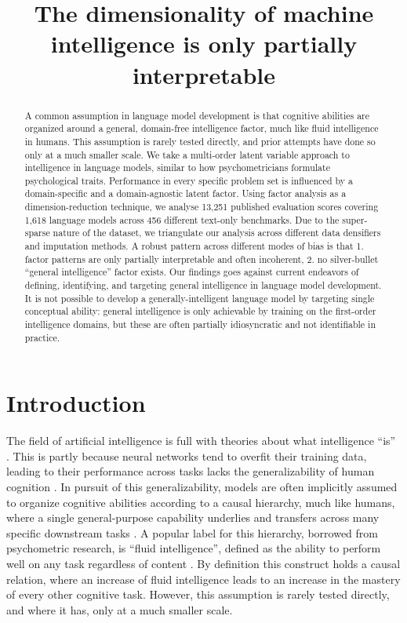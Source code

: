 \documentclass{article} %
\title{The dimensionality of machine intelligence is only partially interpretable}
\author{%
}
\begin{document}
\maketitle


\begin{abstract}
    A common assumption in language model development is that cognitive abilities are organized around a general, domain-free intelligence factor, much like fluid intelligence in humans. This
    assumption is rarely tested directly, and prior attempts have done so only at a much smaller scale. We take a multi-order latent variable approach to intelligence in language models, similar to
    how psychometricians formulate psychological traits. Performance in every specific problem set is influenced by a domain-specific and a domain-agnostic latent factor. Using factor analysis as a
    dimension-reduction technique, we analyse 13,251 published evaluation scores covering 1,618 language models across 456 different text-only benchmarks. Due to the super-sparse nature of the
    dataset, we triangulate our analysis across different data densifiers and imputation methods. A robust pattern across different modes of bias is that 1. factor patterns are only partially
    interpretable and often incoherent, 2. no silver-bullet ``general intelligence'' factor exists. Our findings goes against current endeavors of defining, identifying, and targeting general
    intelligence in language model development. It is not possible to develop a generally-intelligent language model by targeting single conceptual ability: general intelligence is only achievable by
    training on the first-order intelligence domains, but these are often partially idiosyncratic and not identifiable in practice.
  \end{abstract}


\hypertarget{introduction}{%
\section{Introduction}\label{introduction}}

The field of artificial intelligence is full with theories about what intelligence ``is'' \citep{chollet2019,morris2023,waterhouse2023}. This is partly because neural networks tend to overfit their
training data, leading to their performance across tasks lacks the generalizability of human cognition \citep{zhang2017}. In pursuit of this generalizability, models are often implicitly assumed to
organize cognitive abilities according to a causal hierarchy, much like humans, where a single general-purpose capability underlies and transfers across many specific downstream tasks
\citep{bommasani2021}. A popular label for this hierarchy, borrowed from psychometric research, is ``fluid intelligence'', defined as the ability to perform well on any task regardless of content
\citep{cattell1963}. By definition this construct holds a causal relation, where an increase of fluid intelligence leads to an increase in the mastery of every other cognitive task. However, this
assumption is rarely tested directly, and where it has, only at a much smaller scale.
\end{document}
